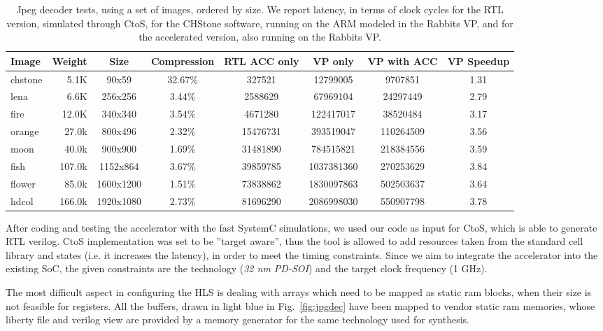 \documentclass{acm_proc_article-sp}
\begin{document}
\begin{table*}[t]
\centering
\begin{tabular}{l|rcc|c|ccc}
\hline
\textbf{Image} & \textbf{Weight} & \textbf{Size} & \textbf{Compression} & \textbf{RTL ACC only} & \textbf{VP only} & \textbf{VP with ACC} & \textbf{VP Speedup} \\
\hline
chstone & 5.1K   & 90x59     & 32.67\% & 327521   & 12799005   & 9707851   & 1.31\\ 
lena    & 6.6K   & 256x256   & 3.44\%  & 2588629  & 67969104   & 24297449  & 2.79\\
fire    & 12.0K  & 340x340   & 3.54\%  & 4671280  & 122417017  & 38520484  & 3.17\\
orange  & 27.0k  & 800x496   & 2.32\%  & 15476731 & 393519047  & 110264509 & 3.56\\
moon    & 40.0k  & 900x900   & 1.69\%  & 31481890 & 784515821  & 218384556 & 3.59\\
fish    & 107.0k & 1152x864  & 3.67\%  & 39859785 & 1037381360 & 270253629 & 3.84\\
flower  & 85.0k  & 1600x1200 & 1.51\%  & 73838862 & 1830097863 & 502503637 & 3.64\\
hdcol   & 166.0k & 1920x1080 & 2.73\%  & 81696290 & 2086998030 & 550907798 & 3.78\\
\hline
\end{tabular}
\caption{\footnotesize Jpeg decoder tests, using a set of images, ordered by size.
We report latency, in terms of clock cycles for the RTL version, simulated through
CtoS, for the CHStone software, running on the ARM modeled in the Rabbits VP, and
for the accelerated version, also running on the Rabbits VP.}
\label{tab:lat}
\end{table*}

After coding and testing the accelerator with the fast SystemC simulations,
we used our code as input for CtoS, which is able to generate RTL verilog.
CtoS implementation was set to be ''target aware'', thus the tool is allowed
to add resources taken from the standard cell library and states (i.e. it increases
the latency), in order to meet the timing constraints.
Since we aim to integrate the accelerator into the existing SoC, the given constraints
are the technology (\emph{32 nm PD-SOI}) and the target clock frequency (1 GHz).

The most difficult aspect in configuring the HLS is dealing with arrays which need to
be mapped as static ram blocks, when their size is not feasible for registers.
All the buffers, drawn in light blue in Fig.~\ref{fig:jpgdec} have been mapped
to vendor static ram memories, whose liberty file and verilog view are provided by
a memory generator for the same technology used for synthesis.
\end{document}
